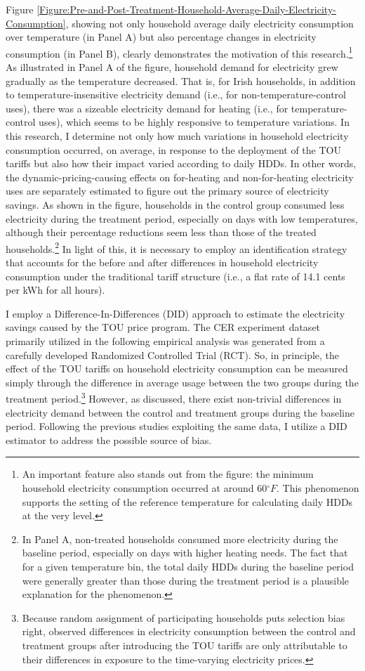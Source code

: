 Figure \ref{Figure:Pre-and-Post-Treatment-Household-Average-Daily-Electricity-Consumption}, showing not only household average daily electricity consumption over temperature (in Panel A) but also percentage changes in electricity consumption (in Panel B), clearly demonstrates the motivation of this research.\footnote{An important feature also stands out from the figure: the minimum household electricity consumption occurred at around 60$^{\circ}F$. This phenomenon supports the setting of the reference temperature for calculating daily HDDs at the very level.} As illustrated in Panel A of the figure, household demand for electricity grew gradually as the temperature decreased. That is, for Irish households, in addition to temperature-insensitive electricity demand (i.e., for non-temperature-control uses), there was a sizeable electricity demand for heating (i.e., for temperature-control uses), which seems to be highly responsive to temperature variations. In this research, I determine not only how much variations in household electricity consumption occurred, on average, in response to the deployment of the TOU tariffs but also how their impact varied according to daily HDDs. In other words, the dynamic-pricing-causing effects on for-heating and non-for-heating electricity uses are separately estimated to figure out the primary source of electricity savings. As shown in the figure, households in the control group consumed less electricity during the treatment period, especially on days with low temperatures, although their percentage reductions seem less than those of the treated households.\footnote{In Panel A, non-treated households consumed more electricity during the baseline period, especially on days with higher heating needs. The fact that for a given temperature bin, the total daily HDDs during the baseline period were generally greater than those during the treatment period is a plausible explanation for the phenomenon.} In light of this, it is necessary to employ an identification strategy that accounts for the before and after differences in household electricity consumption under the traditional tariff structure (i.e., a flat rate of 14.1 cents per kWh for all hours).

I employ a Difference-In-Differences (DID) approach to estimate the electricity savings caused by the TOU price program. The CER experiment dataset primarily utilized in the following empirical analysis was generated from a carefully developed Randomized Controlled Trial (RCT). So, in principle, the effect of the TOU tariffs on household electricity consumption can be measured simply through the difference in average usage between the two groups during the treatment period.\footnote{Because random assignment of participating households puts selection bias right, observed differences in electricity consumption between the control and treatment groups after introducing the TOU tariffs are only attributable to their differences in exposure to the time-varying electricity prices.} However, as discussed, there exist non-trivial differences in electricity demand between the control and treatment groups during the baseline period. Following the previous studies exploiting the same data, I utilize a DID estimator to address the possible source of bias. 

